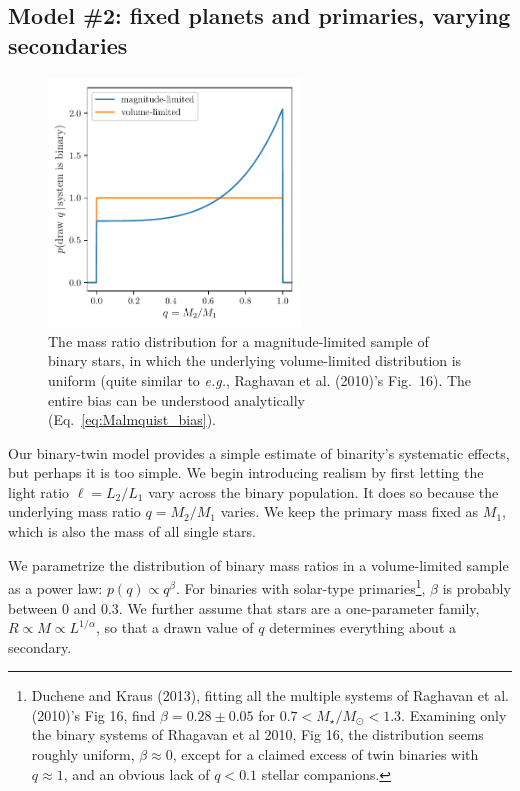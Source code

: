 \subsection{Model \#2: fixed planets and primaries, varying secondaries}
\label{sec:model_2}

\begin{figure}[!tb]
    \centering
    \includegraphics[width=0.6\textwidth]{figures/mass_ratio_distribution.pdf}
    \caption{
        The mass ratio distribution for a magnitude-limited sample of 
        binary stars, in which the underlying volume-limited distribution is 
        uniform (quite similar to {\it e.g.}, Raghavan et al. (2010)'s 
        Fig.~16).
        The entire bias can be understood analytically 
        (Eq.~\ref{eq:Malmquist_bias}).
    }
    \label{fig:q_distribn_mag_limited}
\end{figure}

Our binary-twin model provides a simple estimate of binarity's systematic 
effects, but perhaps it is too simple.
We begin introducing realism by first letting the light ratio $\ell = L_2/L_1$ 
vary across the binary population.
It does so because the underlying mass ratio $q=M_2/M_1$ varies.
We keep the primary mass fixed as $M_1$, which is also the mass of all single 
stars.

We parametrize the distribution of binary mass ratios in a volume-limited 
sample as a power law: $p(q)\propto q^\beta$.
For binaries with solar-type primaries\footnote{
Duchene and Kraus (2013), fitting all the multiple systems of Raghavan et al. 
(2010)'s Fig 16, find $\beta = 0.28\pm0.05$ for $0.7<M_\star/M_\odot<1.3$.
Examining only the binary systems of Rhagavan et al 2010, Fig 16, the 
distribution seems roughly uniform, $\beta \approx 0$, except for a claimed 
excess of twin binaries with $q\approx 1$, and an obvious lack of $q<0.1$ 
stellar companions.
}, $\beta$ is probably between 0 and 0.3.
We further assume that stars are a one-parameter family, $R \propto M \propto 
L^{1/\alpha}$, so that a drawn value of $q$ determines everything about a 
secondary.

